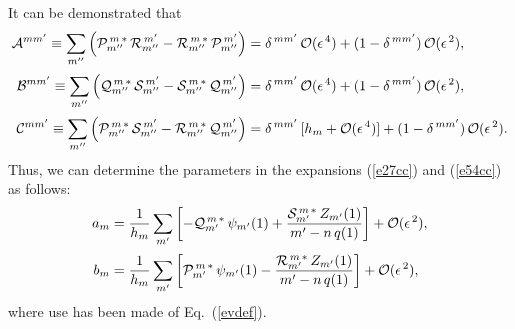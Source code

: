 \documentclass[12pt,prb,aps]{revtex4-1}
\begin{document}
It can be demonstrated that\,\cite{am1}
\begin{align}\label{e286}
{\cal A}^{mm'}\equiv\sum_{m''}\left({\cal P}_{m''}^{\,m\,\ast}\,{\cal R}_{m''}^{\,m'}- {\cal R}_{m''}^{\,m\,\ast}\,{\cal P}_{m''}^{\,m'}\right)&= \delta^{\,mm'}\,{\cal O}(\epsilon^{\,4})+ (1-\delta^{\,mm'})\,{\cal O}(\epsilon^{\,2}),\\[0.5ex]
{\cal B}^{mm'}\equiv\sum_{m''}\left({\cal Q}_{m''}^{\,m\,\ast}\,{\cal S}_{m''}^{\,m'}- {\cal S}_{m''}^{\,m\,\ast}\,{\cal Q}_{m''}^{\,m'}\right)&= \delta^{\,mm'}\,{\cal O}(\epsilon^{\,4})+ (1-\delta^{\,mm'})\,{\cal O}(\epsilon^{\,2}),\\[0.5ex]
{\cal C}^{mm'}\equiv\sum_{m''}\left({\cal P}_{m''}^{\,m\,\ast}\,{\cal S}_{m''}^{\,m'}- {\cal R}_{m''}^{\,m\,\ast}\,{\cal Q}_{m''}^{\,m'}\right)&= \delta^{\,mm'}\,[h_m+{\cal O}(\epsilon^{\,4})]+ (1-\delta^{\,mm'})\,{\cal O}(\epsilon^{\,2}).\label{e288}
\end{align}
Thus, we can determine the parameters in the expansions (\ref{e27cc}) and (\ref{e54cc}) as follows:
\begin{align}
a_m &= \frac{1}{h_m}\sum_{m'}\left[-{\cal Q}_{m'}^{\,m\,\ast}\,\psi_{m'}(1) + \frac{{\cal S}_{m'}^{\,m\,\ast}\,Z_{m'}(1)}{m'-n\,q(1)}\right]+{\cal O}(\epsilon^{\,2}),\\[0.5ex]
b_m &= \frac{1}{h_m}\sum_{m'}\left[{\cal P}_{m'}^{\,m\,\ast}\,\psi_{m'}(1) -\frac{{\cal R}_{m'}^{\,m\,\ast}\,Z_{m'}(1)}{m'-n\,q(1)}\right]+{\cal O}(\epsilon^{\,2}),\label{e291}
\end{align}
where use has been made of Eq.~(\ref{evdef}).
\end{document}
